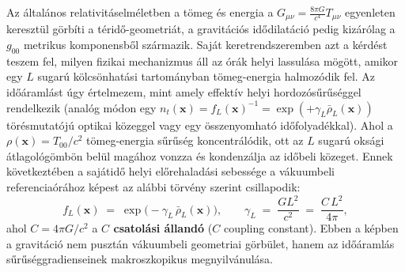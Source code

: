 \documentclass[10pt,a4paper]{article}
\begin{document}
\par
Az \'altal\'anos relativit\'aselm\'eletben a t\"omeg \'es energia a $G_{\mu\nu} = \frac{8\pi G}{c^4}T_{\mu\nu}$ egyenleten kereszt\"ul g\"orb\'iti a t\'erid\H{o}-geometri\'at, a gravit\'aci\'os id\H{o}dilat\'aci\'o pedig kiz\'ar\'olag a $g_{00}$ metrikus komponensb\H{o}l sz\'armazik. Saj\'at keretrendszeremben azt a k\'erd\'est teszem fel, milyen fizikai mechanizmus \'all az \'or\'ak helyi lassul\'asa m\"og\"ott, amikor egy $L$ sugar\'u k\"olcs\"onhat\'asi tartom\'anyban t\"omeg-energia halmoz\'odik fel. Az id\H{o}\'araml\'ast \'ugy \'ertelmezem, mint amely effekt\'iv helyi hordoz\'os\H{u}r\H{u}s\'eggel rendelkezik (anal\'og m\'odon egy $n_t(\mathbf{x}) = f_L(\mathbf{x})^{-1} = \exp(+\gamma_L \bar{\rho}_L(\mathbf{x}))$ t\"or\'esmutat\'oj\'u optikai k\"ozeggel vagy egy \"osszenyomhat\'o id\H{o}folyad\'ekkal). Ahol a $\rho(\mathbf{x}) = T_{00}/c^2$ t\"omeg-energia s\H{u}r\H{u}s\'eg koncentr\'al\'odik, ott az $L$ sugar\'u oks\'agi \'atlagol\'og\"omb\"on bel\"ul mag\'ahoz vonzza \'es kondenz\'alja az id\H{o}beli k\"ozeget. Ennek k\"ovetkezt\'eben a saj\'atid\H{o} helyi el\H{o}rehalad\'asi sebess\'ege a v\'akuumbeli referencia\'or\'ahoz k\'epest az al\'abbi t\"orv\'eny szerint csillapodik:
\begin{equation}
  f_L(\mathbf{x}) \;=\; \exp\!\bigl(-\gamma_L\,\bar{\rho}_L(\mathbf{x})\bigr), \qquad \gamma_L \;=\; \frac{G L^2}{c^2} \;=\; \frac{C\,L^2}{4\pi},
\end{equation}
ahol $C = 4\pi G/c^2$ a \textbf{$C$ csatol\'asi \'alland\'o} ($C$ coupling constant). Ebben a k\'epben a gravit\'aci\'o nem puszt\'an v\'akuumbeli geometriai g\"orb\"ulet, hanem az id\H{o}\'araml\'as s\H{u}r\H{u}s\'eggradienseinek makroszkopikus megnyilv\'anul\'asa.
\end{document}

